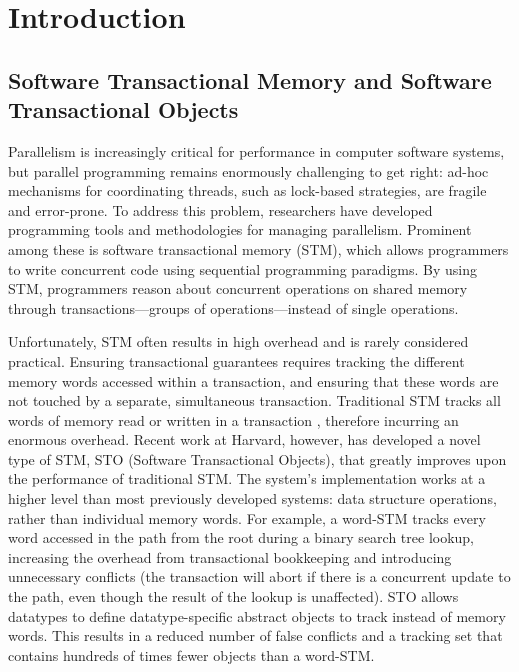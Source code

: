 \section{Introduction}
\subsection{Software Transactional Memory and Software Transactional Objects}
Parallelism is increasingly critical for performance in computer software systems, but parallel programming remains enormously challenging to get right: ad-hoc mechanisms for coordinating threads, such as lock-based strategies, are fragile and error-prone. To address this problem, researchers have developed programming tools and methodologies for managing parallelism. Prominent among these is software transactional memory (STM), which allows programmers to write concurrent code using sequential programming paradigms. By using STM, programmers reason about concurrent operations on shared memory through transactions---groups of operations---instead of single operations. 

Unfortunately, STM often results in high overhead and is rarely considered practical. Ensuring transactional guarantees requires tracking the different memory words accessed within a transaction, and ensuring that these words are not touched by a separate, simultaneous transaction. Traditional STM tracks all words of memory read or written in a transaction , therefore incurring an enormous overhead. Recent work at Harvard, however, has developed a novel type of STM, STO (Software Transactional Objects), that greatly improves upon the performance of traditional STM. The system's implementation works at a higher level than most previously developed systems: data structure operations, rather than individual memory words. For example, a word-STM tracks every word accessed in the path from the root during a binary search tree lookup, increasing the overhead from transactional bookkeeping and introducing unnecessary conflicts (the transaction will abort if there is a concurrent update to the path, even though the result of the lookup is unaffected). STO allows datatypes to define datatype-specific abstract objects to track instead of memory words. This results in a reduced number of false conflicts and a tracking set that contains hundreds of times fewer objects than a word-STM. 

